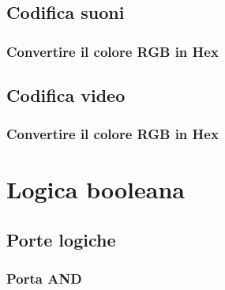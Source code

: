 \documentclass[11pt,fleqn]{book}
\begin{document}


\chapter{Codifica suoni}

\section{Convertire il colore RGB in Hex}



\chapter{Codifica video}

\section{Convertire il colore RGB in Hex}



\part{Logica booleana}


\chapter{Porte logiche}

\section{Porta AND}
\end{document}

